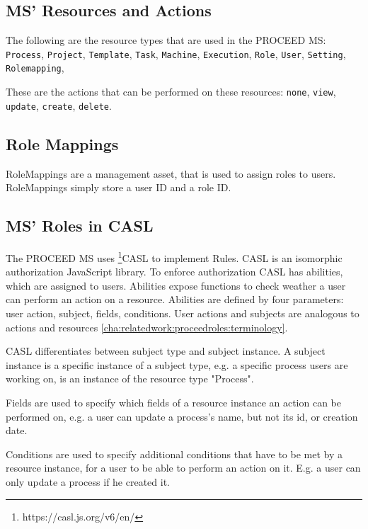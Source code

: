\subsection{MS' Resources and Actions}
\label{cha:relatedwork:proceedroles:ms-resources-actions}

The following are the resource types that are used in the PROCEED MS:
\lstinline{Process},
\lstinline{Project},
\lstinline{Template},
\lstinline{Task},
\lstinline{Machine},
\lstinline{Execution},
\lstinline{Role},
\lstinline{User},
\lstinline{Setting},
\lstinline{Rolemapping},

These are the actions that can be performed on these resources:
\lstinline{none},
\lstinline{view},
\lstinline{update},
\lstinline{create},
\lstinline{delete}.

\subsection{Role Mappings}
\label{cha:relatedwork:proceedroles:role-mappings}

RoleMappings are a management asset, that is used to assign roles to users.
RoleMappings simply store a user ID and a role ID.

\subsection{MS' Roles in CASL}
\label{cha:relatedwork:proceedroles:casl}

The PROCEED MS uses \footnote{https://casl.js.org/v6/en/}{CASL} to implement Rules. CASL
is an isomorphic authorization JavaScript library.
To enforce authorization CASL has abilities, which are assigned to users.
Abilities expose functions to check weather a user can perform an action on a resource.
Abilities are defined by four parameters: user action, subject, fields, conditions.
User actions and subjects are analogous to actions and resources \ref{cha:relatedwork:proceedroles:terminology}.

CASL differentiates between subject type and subject instance.
A subject instance is a specific instance of a subject type, e.g. a specific process
users are working on, is an instance of the resource type "Process".

Fields are used to specify which fields of a resource instance an action can be performed
on, e.g. a user can update a process's name, but not its id, or creation date.

Conditions are used to specify additional conditions that have to be met by a resource
instance, for a user to be able to perform an action on it. E.g. a user can only update a
process if he created it.

